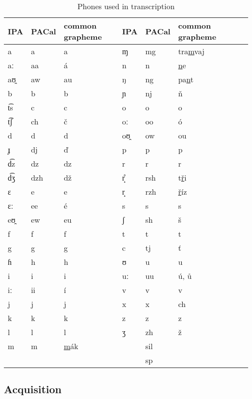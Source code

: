 \documentclass{itatnew}
\begin{document}
\begin{table}[htpb]
\begin{center}
\begin{tabular}{|l|l|l|l||l|l|l|l|}
\hline
IPA & PACal & common grapheme & IPA & PACal &  common grapheme \\
\hline
a  & a   & a      &     ɱ  & mg  & tra\underline{m}vaj \\
aː & aa  & á      &     n  & n   & \underline{n}e \\
aʊ̯ & aw  & au     &     ŋ  & ng  & pa\underline{n}t \\
b  & b   & b      &     ɲ  & nj  & \v{n} \\
t͡s & c   & c      &     o  & o   & o \\
t͡ʃ & ch  & č      &     oː & oo  & ó \\
d  & d   & d      &     oʊ̯ & ow  & ou \\
ɟ  & dj  & \v{d}  &     p  & p   & p \\
d͡z & dz  & dz     &     r  & r   & r \\
d͡ʒ & dzh & dž     &     r̝̊  & rsh & t\underline{\v{r}}i \\
ɛ  & e   & e      &     r̝  & rzh & \underline{\v{r}}íz \\
ɛː & ee  & é      &     s  & s   & s \\
eʊ̯ & ew  & eu     &     ʃ  & sh  & š \\
f  & f   & f      &     t  & t   & t \\
g  & g   & g      &     c  & tj  & \v{t} \\
ɦ  & h   & h      &     ʊ  & u   & u \\
i  & i   & i      &     uː & uu  & ú, \r{u} \\
iː & ii  & í      &     v  & v   & v \\
j  & j   & j      &     x  & x   & ch \\
k  & k   & k      &     z  & z   & z \\
l  & l   & l      &     ʒ  & zh  & ž \\
m  & m   & \underline{m}ák
                  &        & sil & \\
   &     &        &        & sp  & \\
\hline
\end{tabular}
\caption{Phones used in transcription}\label{tab:phones}
\end{center}
\end{table}
\normalfont

\subsection{Acquisition}
\end{document}
